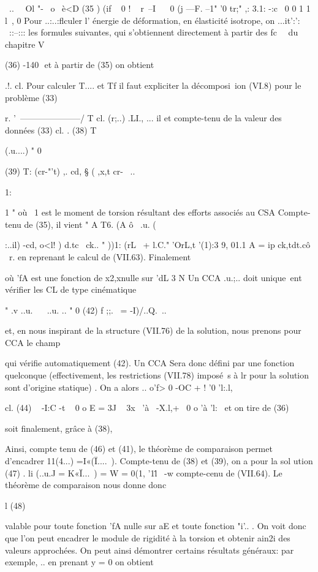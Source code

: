 {{{{{{{{~.. ~~Ol "-~
o~ è<D
(35 ) (if ~ 0 ! ~­
r~--I~ ~ 0 (j ---F. 
--1" '0 tr;" ,: 3.1:
-:c~
0 0 1 1
l~, 
0 
Pour ..:..:flculer l' énergie de déformation, en élasticité isotrope, on ...it':': ~::--::: les formules suivantes, qui s'obtiennent directement à partir des fc~~ du chapitre V 

(36) 
-140 ­
et à partir de (35) on obtient 

.!. cl.
Pour calculer T.... et Tf il faut expliciter la décomposi~ion (VI.8) pour le problème (33) 

r. 
'~---------------------/ 
T cl. 
(r;..)
.LI., ... il 
et compte-tenu de la valeur des données (33) 
cl. . 
(38) 
T{ (.u....) " 0 

(39) 
T: (cr-"'t) ,. cd, § ( ,x,t cr-~ .. 


1:

1 
"­
où ~1 est le moment de torsion résultant des efforts associés au CSA Compte-tenu de (35), il vient 
" 
A 
T6. (A ô~ 
.u. (}:..il) -cd, o<l! ) d.tc~ ck..
" ))1: (rL~ + l.C."
'OrL,t '(1):3 
9, 01.1 A 
= ip ck,tdt.cô
~r. 
en reprenant le calcul de (VII.63). Finalement 

où 'fA est une fonction de x2,xnulle sur 'dL
3 
N 
Un CCA .u.;.. doit unique~ent vérifier les CL de type cinématique 

" .v 
..u.~ ~ ..u. .. " 0 
(42) f 
;;.~ = -I)/..Q.~.. 

et, en nous inspirant de la structure (VII.76) de la solution, nous prenons pour CCA le champ 

qui vérifie automatiquement (42). Un CCA Sera donc défini par une fonction quelconque (effectivement, les restrictions (VII.78) imposé~s à lr pour la solution sont d'origine statique) . On a alors 
.. 
o'f>
0 -OC +
! 
'0 'l:.l, 

cl.
(44) ~ 
-I:C -t ~ 0 o
E = 
3J 
~ 3x~ 
'à~ 
-X.l,+~ 0 o 'à 'l:~ 
et on tire de (36) 

soit finalement, grâce à (38), 

Ainsi, compte tenu de (46) et (41), le théorème de comparaison permet d'encadrer 11(4...) =I«(Ï....~). Compte-tenu de (38) et (39), on a pour la sol ution 
(47) . li (..u.J = K«Ï...~) = W = 0(1, '1l\.~ -w 
compte-cenu de (VII.64). Le théorème de comparaison nous donne donc 


l 
(48) 


valable pour toute fonction 'fA nulle sur aE et toute fonction "i'.. . On voit 
donc que l'on peut encadrer le module de rigidité à la torsion et obtenir ain2i des valeurs approchées. 
On peut ainsi démontrer certains résultats généraux: par exemple,
.. 
en prenant y = 0 on obtient 

}}}}}}}}
